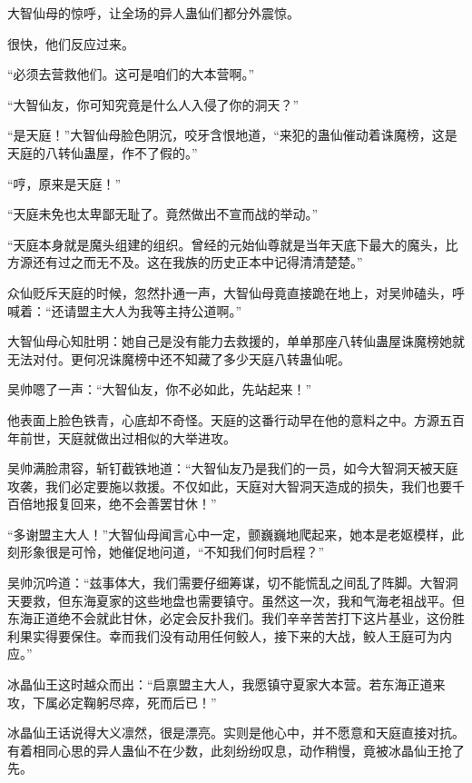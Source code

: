 
\begin{this_body}

大智仙母的惊呼，让全场的异人蛊仙们都分外震惊。

很快，他们反应过来。

“必须去营救他们。这可是咱们的大本营啊。”

“大智仙友，你可知究竟是什么人入侵了你的洞天？”

“是天庭！”大智仙母脸色阴沉，咬牙含恨地道，“来犯的蛊仙催动着诛魔榜，这是天庭的八转仙蛊屋，作不了假的。”

“哼，原来是天庭！”

“天庭未免也太卑鄙无耻了。竟然做出不宣而战的举动。”

“天庭本身就是魔头组建的组织。曾经的元始仙尊就是当年天底下最大的魔头，比方源还有过之而无不及。这在我族的历史正本中记得清清楚楚。”

众仙贬斥天庭的时候，忽然扑通一声，大智仙母竟直接跪在地上，对吴帅磕头，呼喊着：“还请盟主大人为我等主持公道啊。”

大智仙母心知肚明：她自己是没有能力去救援的，单单那座八转仙蛊屋诛魔榜她就无法对付。更何况诛魔榜中还不知藏了多少天庭八转蛊仙呢。

吴帅嗯了一声：“大智仙友，你不必如此，先站起来！”

他表面上脸色铁青，心底却不奇怪。天庭的这番行动早在他的意料之中。方源五百年前世，天庭就做出过相似的大举进攻。

吴帅满脸肃容，斩钉截铁地道：“大智仙友乃是我们的一员，如今大智洞天被天庭攻袭，我们必定要施以救援。不仅如此，天庭对大智洞天造成的损失，我们也要千百倍地报复回来，绝不会善罢甘休！”

“多谢盟主大人！”大智仙母闻言心中一定，颤巍巍地爬起来，她本是老妪模样，此刻形象很是可怜，她催促地问道，“不知我们何时启程？”

吴帅沉吟道：“兹事体大，我们需要仔细筹谋，切不能慌乱之间乱了阵脚。大智洞天要救，但东海夏家的这些地盘也需要镇守。虽然这一次，我和气海老祖战平。但东海正道绝不会就此甘休，必定会反扑我们。我们辛辛苦苦打下这片基业，这份胜利果实得要保住。幸而我们没有动用任何鲛人，接下来的大战，鲛人王庭可为内应。”

冰晶仙王这时越众而出：“启禀盟主大人，我愿镇守夏家大本营。若东海正道来攻，下属必定鞠躬尽瘁，死而后已！”

冰晶仙王话说得大义凛然，很是漂亮。实则是他心中，并不愿意和天庭直接对抗。有着相同心思的异人蛊仙不在少数，此刻纷纷叹息，动作稍慢，竟被冰晶仙王抢了先。


\end{this_body}
